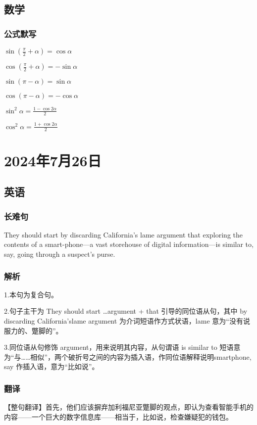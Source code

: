 \documentclass[UTF8]{ctexart}
\begin{document}
\subsection{数学}
\subsubsection{公式默写}
\begin{multicols}{3}
      $\sin\left ( \frac{\pi}{2} + \alpha  \right ) =\cos \alpha$

      $\cos\left ( \frac{\pi}{2}+\alpha\right )=-\sin \alpha$

      $\sin \left ( \pi - \alpha\right )=\sin \alpha$

      $\cos \left ( \pi - \alpha\right )=-\cos \alpha$

      $\sin^2\alpha=\frac{1-\cos 2\alpha}{2}$

      $\cos^2\alpha=\frac{1+\cos 2\alpha}{2}$
\end{multicols}
\section{2024年7月26日}
\subsection{英语}
\subsubsection{长难句}
They should start by discarding California's lame argument that exploring the contents of a smart-phone---a vast storehouse of digital information---is similar to, say, going through a suspect's purse.
\subsubsection{解析}
1.本句为复合句。

2.句子主干为 They should start …argument + that 引导的同位语从句，其中 by discarding California’slame argument 为介词短语作方式状语，lame 意为“没有说
服力的、蹩脚的”。

3.同位语从句修饰 argument，用来说明其内容，从句谓语 is similar to 短语意为“与……相似”，两个破折号之间的内容为插入语，作同位语解释说明smartphone, say 作插入语，意为“比如说”。
\subsubsection{翻译}
【整句翻译】首先，他们应该摒弃加利福尼亚蹩脚的观点，即认为查看智能手机的内容——一个巨大的数字信息库——相当于，比如说，检查嫌疑犯的钱包。
\end{document}
